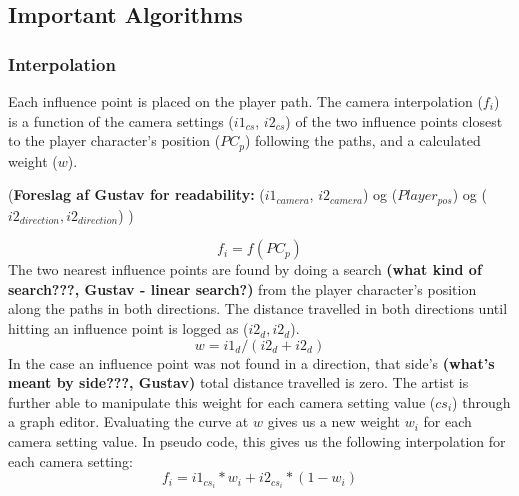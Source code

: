 \subsection{Important Algorithms}
\subsubsection{Interpolation}

Each influence point is placed on the player path. The camera interpolation ($f_{i}$) is a function of the camera settings ($i1_{cs}$, $i2_{cs}$) of the two influence points closest to the player character's position ($PC_{p}$) following the paths, and a calculated weight ($w$).

(\textbf{Foreslag af Gustav for readability:}
($i1_{camera}$, $i2_{camera}$) og ($Player_{pos}$) og ($i2_{direction}, i2_{direction}$) )

\begin{equation}
f_{i} = f(PC_{p})
\end{equation}
The two nearest influence points are found by doing a search \textbf{(what kind of search???, Gustav - linear search?)} from the player character's position along the paths in both directions. The distance travelled in both directions until hitting an influence point is logged as ($i2_{d}, i2_{d}$).
\begin{equation}
w = i1_{d}/(i2_{d} + i2_{d})
\end{equation}
In the case an influence point was not found in a direction, that side's \textbf{(what's meant by side???, Gustav)} total distance travelled is zero. The artist is further able to manipulate this weight for each camera setting value ($cs_{i}$) through a graph editor. Evaluating the curve at $w$ gives us a new weight $w_{i}$ for each camera setting value. In pseudo code, this gives us the following interpolation for each camera setting:
\begin{equation}
f_{i} = i1_{cs_{i}} * w_{i} + i2_{cs_{i}} * (1-w_{i})
\end{equation}
